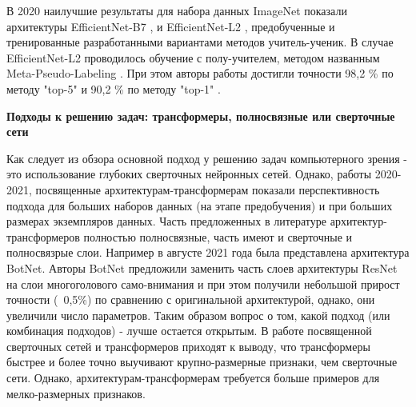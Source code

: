 \documentclass[12pt]{article}
\begin{document}
\begin{sloppypar}
В 2020 наилучшие результаты для набора данных ImageNet показали архитектуры EfficientNet-B7 \cite{xie2020self}, и EfficientNet-L2 \cite{pham2021meta}, предобученные и тренированные разработанными вариантами методов учитель-ученик.  В случае EfficientNet-L2 проводилось обучение с полу-учителем, методом названным Meta-Pseudo-Labeling \cite{pham2021meta}. При этом авторы работы \cite{pham2021meta} достигли точности 98,2 \% по методу "top-5" и 90,2 \% по методу "top-1" \cite{paperswithcodeImagenet}. 
\newline

\noindent\textbf{Подходы к решению задач: трансформеры, полносвязные или сверточные сети} 

Как следует из обзора основной подход у решению задач компьютерного зрения - это использование глубоких сверточных нейронных сетей. Однако, работы 2020-2021, посвященные архитектурам-трансформерам показали перспективность подхода для больших наборов данных (на этапе предобучения) и при больших размерах экземпляров данных. Часть предложенных в литературе архитектур- трансформеров полностью полносвязные, часть имеют и сверточные и полносвязрые слои. Например в августе 2021 года была представлена архитектура BotNet. Авторы BotNet предложили заменить часть слоев архитектуры ResNet на слои многоголового само-внимания и при этом получили небольшой прирост точности (~0,5\%) по сравнению с оригинальной архитектурой, однако, они увеличили число параметров\cite{srinivas2021bottleneck}. Таким образом вопрос о том, какой подход (или комбинация подходов) - лучше остается открытым. В работе \cite{raghu2021vision} посвященной сверточных сетей и трансформеров приходят к выводу, что трансформеры быстрее и более точно выучивают крупно-размерные признаки, чем сверточные сети. Однако, архитектурам-трансформерам требуется больше примеров для мелко-размерных признаков. 


\end{sloppypar}
\end{document}
